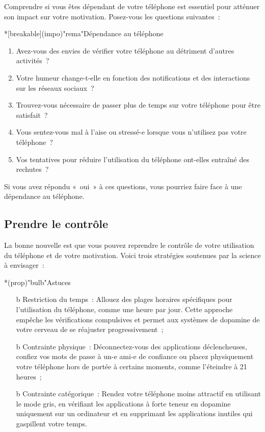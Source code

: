\documentclass[a4paper, 12pt, garamond]{book}
\begin{document}
Comprendre si vous êtes dépendant de votre téléphone est essentiel pour atténuer
son impact sur votre motivation. Posez-vous les questions suivantes~:
\begin{tcn}*[breakable](impo)"rema"{Dépendance au téléphone}
	\begin{enumerate}
		\item Avez-vous des envies de vérifier votre téléphone au détriment d'autres
		      activités~?
		\item Votre humeur change-t-elle en fonction des notifications et des
		      interactions sur les réseaux sociaux~?
		\item Trouvez-vous nécessaire de passer plus de temps sur votre téléphone pour
		      être satisfait~?
		\item Vous sentez-vous mal à l'aise ou stressé-e lorsque vous n'utilisez pas
		      votre téléphone~?
		\item Vos tentatives pour réduire l'utilisation du téléphone ont-elles
		      entraîné des rechutes~?
	\end{enumerate}
\end{tcn}

Si vous avez répondu «~oui~» à ces questions, vous pourriez faire face à une
dépendance au téléphone.

\subsection{Prendre le contrôle}

La bonne nouvelle est que vous pouvez reprendre le contrôle de votre utilisation
du téléphone et de votre motivation. Voici trois stratégies soutenues par la
science à envisager~:
\begin{tcn}*(prop)"bulb"{Astuces}
	\begin{enumerate}
		\item[b]{Restriction du temps}~: Allouez des plages horaires spécifiques
		pour l'utilisation du téléphone, comme une heure par jour. Cette
		approche empêche les vérifications compulsives et permet aux systèmes de
		dopamine de votre cerveau de se réajuster progressivement~;
		\item[b]{Contrainte physique}~: Déconnectez-vous des applications
		déclencheuses, confiez vos mots de passe à un-e ami-e de confiance ou placez
		physiquement votre téléphone hors de portée à certains moments, comme
		l'éteindre à 21 heures~;
		\item[b]{Contrainte catégorique}~: Rendez votre téléphone moins attractif
		en utilisant le mode gris, en vérifiant les applications à forte teneur en
		dopamine uniquement sur un ordinateur et en supprimant les applications
		inutiles qui gaspillent votre temps.
	\end{enumerate}
\end{tcn}
\end{document}
